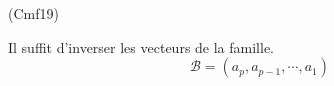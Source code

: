 \begin{tiny}(Cmf19)\end{tiny} Il suffit d'inverser les vecteurs de la famille.
\begin{displaymath}
 \mathcal{B}=(a_p,a_{p-1},\cdots,a_1)
\end{displaymath}
 